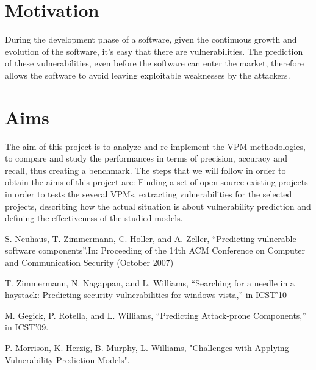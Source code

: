 \documentclass[twocolumn,10pt]{asme2ej}
\begin{document}
\section{Motivation}
During the development phase of a software, given the continuous growth and evolution of the software, it's easy that there are vulnerabilities. The prediction of these vulnerabilities, even before the software can enter the market, therefore allows the software to avoid leaving exploitable weaknesses by the attackers. 


\section{Aims}
The aim of this project is to analyze and re-implement the VPM methodologies, to compare and study the performances in terms of precision, accuracy and recall, thus creating a benchmark.
The steps that we will follow in order to obtain the aims of this project are: Finding a set of open-source existing projects in order to tests the several VPMs, extracting vulnerabilities for the selected projects, describing how the actual situation is about vulnerability prediction and defining the effectiveness of the studied models.
\newpage

\begin{thebibliography}{9}
	
	  S. Neuhaus, T. Zimmermann, C. Holler, and A. Zeller, “Predicting
vulnerable software components”.In:
	Proceeding of the 14th ACM Conference on Computer
	and Communication Security (October 2007)

T. Zimmermann, N. Nagappan, and L. Williams, “Searching for a needle
in a haystack: Predicting security vulnerabilities for windows vista,” in
ICST’10

 M. Gegick, P. Rotella, and L. Williams, “Predicting Attack-prone
Components,” in ICST’09.

P. Morrison, K. Herzig, B. Murphy, L. Williams, "Challenges with Applying
Vulnerability Prediction Models".
\end{thebibliography}



%





\end{document}
